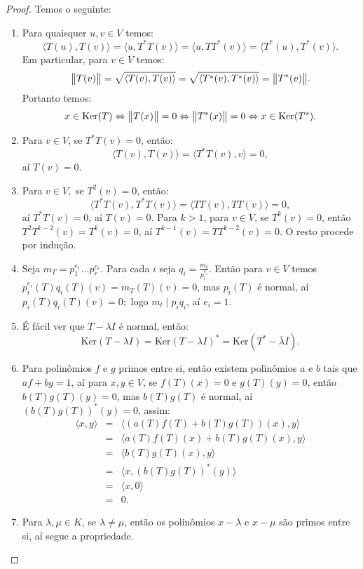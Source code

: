 \documentclass[11pt,twoside,a4paper]{book}
\begin{document}
\begin{proof}
Temos o seguinte:
\begin{enumerate}
\item Para quaisquer $u,v\in V$ temos:
\[
\langle T(u),T(v)\rangle=\langle u,T^*T(v)\rangle=\langle u,TT^*(v)\rangle=\langle T^*(u),T^*(v)\rangle.
\]
Em particular, para $v\in V$ temos:
\[
\norm{T(v)}=\sqrt{\langle T(v),T(v)\rangle}=\sqrt{\langle T^*(v),T^*(v)\rangle}=\norm{T^*(v)}.
\]
Portanto temos:
\[
x\in\mathrm{Ker}(T)\Leftrightarrow\norm{T(x)}=0\Leftrightarrow\norm{T^*(x)}=0\Leftrightarrow x\in\mathrm{Ker}(T^*).
\]
\item Para $v\in V$, se $T^*T(v)=0$, então:
\[
\langle T(v),T(v)\rangle=\langle T^*T(v),v\rangle=0,
\]
aí $T(v)=0$.
\item Para $v\in V,$ se $T^2(v)=0$, então:
\[
\langle T^*T(v),T^*T(v)\rangle=\langle TT(v),TT(v)\rangle=0,
\]
aí $T^*T(v)=0$, aí $T(v)=0$. Para $k>1$, para $v\in V$, se $T^k(v)=0$, então $T^2T^{k-2}(v)=T^k(v)=0$, aí $T^{k-1}(v)=TT^{k-2}(v)=0.$ O resto procede por indução.
\item Seja $m_T=p_1^{e_1}\dots p_r^{e_r}.$ Para cada $i$ seja $q_i=\frac{m_t}{p_i^{e_i}}$. Então para $v\in V$ temos $p_i^{e_i}(T)q_i(T)(v)=m_T(T)(v)=0$, mas $p_i(T)$ é normal, aí $p_i(T)q_i(T)(v)=0;$ logo $m_t\mid p_iq_i$, aí $e_i=1.$
\item É fácil ver que $T-\lambda I$ é normal, então:
\[
\mathrm{Ker}(T-\lambda I)=\mathrm{Ker}(T-\lambda I)^*=\mathrm{Ker}(T^*-\overline{\lambda}I).
\]
\item Para polinômios $f$ e $g$ primos entre si, então existem polinômios $a$ e $b$ tais que $af+bg=1$, aí para $x,y\in V$, se $f(T)(x)=0$ e $g(T)(y)=0$, então $b(T)g(T)(y)=0$, mas $b(T)g(T)$ é normal, aí $(b(T)g(T))^*(y)=0$, assim:
\[
\begin{array}{rcl}
\langle x,y\rangle&=&\langle (a(T)f(T)+b(T)g(T))(x),y\rangle\\
&=&\langle a(T)f(T)(x)+b(T)g(T)(x),y\rangle\\
&=&\langle b(T)g(T)(x),y\rangle\\
&=&\langle x,(b(T)g(T))^*(y)\rangle\\
&=&\langle x,0\rangle\\
&=&0.
\end{array}
\]
\item Para $\lambda,\mu\in K$, se $\lambda\neq\mu$, então os polinômios $x-\lambda$ e $x-\mu$ são primos entre si, aí segue a propriedade.
\end{enumerate}
\end{proof}
\end{document}
